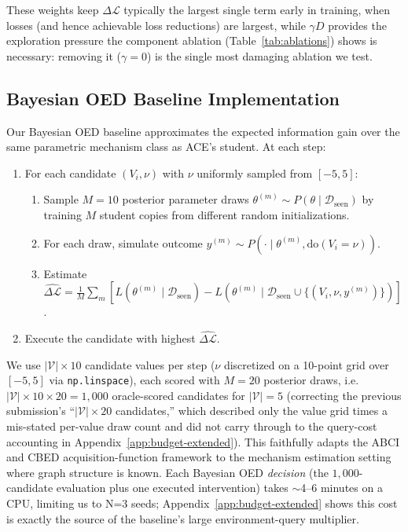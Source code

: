\documentclass[twoside]{article}
\theoremstyle{plain}
\theoremstyle{definition}
\theoremstyle{remark}
\begin{document}
These weights keep $\Delta\mathcal{L}$ typically the largest single term early in training, when losses (and hence achievable loss reductions) are largest, while $\gamma D$ provides the exploration pressure the component ablation (Table~\ref{tab:ablations}) shows is necessary: removing it ($\gamma=0$) is the single most damaging ablation we test.

\subsection{Bayesian OED Baseline Implementation}
\label{app:boed-impl}

Our Bayesian OED baseline approximates the expected information gain over the same parametric mechanism class as ACE's student. At each step:
\begin{enumerate}[leftmargin=1.5em]
\item For each candidate $(V_i, \nu)$ with $\nu$ uniformly sampled from $[-5, 5]$:
  \begin{enumerate}
    \item Sample $M=10$ posterior parameter draws $\theta^{(m)} \sim P(\theta \mid \mathcal{D}_\text{seen})$ by training $M$ student copies from different random initializations.
    \item For each draw, simulate outcome $y^{(m)} \sim P(\cdot \mid \theta^{(m)}, \text{do}(V_i = \nu))$.
    \item Estimate $\widehat{\Delta\mathcal{L}} = \frac{1}{M}\sum_m [L(\theta^{(m)} \mid \mathcal{D}_\text{seen}) - L(\theta^{(m)} \mid \mathcal{D}_\text{seen} \cup \{(V_i, \nu, y^{(m)})\})]$.
  \end{enumerate}
\item Execute the candidate with highest $\widehat{\Delta\mathcal{L}}$.
\end{enumerate}
We use $|\mathcal{V}| \times 10$ candidate values per step ($\nu$ discretized on a 10-point grid over $[-5,5]$ via \texttt{np.linspace}), each scored with $M=20$ posterior draws, i.e.\ $|\mathcal{V}|\times10\times20 = 1{,}000$ oracle-scored candidates for $|\mathcal{V}|=5$ (correcting the previous submission's ``$|\mathcal{V}|\times20$ candidates,'' which described only the value grid times a mis-stated per-value draw count and did not carry through to the query-cost accounting in Appendix~\ref{app:budget-extended}). This faithfully adapts the ABCI \citep{toth2022active} and CBED \citep{tigas2022interventions} acquisition-function framework to the mechanism estimation setting where graph structure is known. Each Bayesian OED \emph{decision} (the $1{,}000$-candidate evaluation plus one executed intervention) takes $\sim$4--6 minutes on a CPU, limiting us to N=3 seeds; Appendix~\ref{app:budget-extended} shows this cost is exactly the source of the baseline's large environment-query multiplier.
\end{document}
